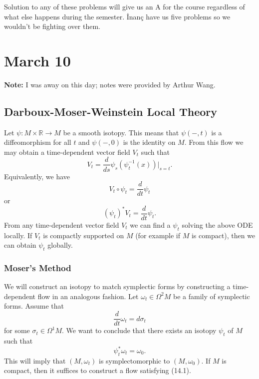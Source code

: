 \documentclass[leqno, openany]{memoir}
\theoremstyle{definition}
\theoremstyle{remark}
\theoremstyle{plain}
\theoremstyle{definition}
\theoremstyle{remark}
\newcommand{\R}{\mathbb{R}}
\begin{document}
Solution to any of these problems will give us an A for the course regardless of what else happens during the semester. \.Inan\c{c} have us five problems so we wouldn't be fighting over them.

\chapter{March 10}%
\label{cha:march_10}

\textbf{Note:} I was away on this day; notes were provided by Arthur Wang.

\section{Darboux-Moser-Weinstein Local Theory}%
\label{sec:darboux_moser_weinstein_local_theory}

Let $\psi: M \times \R \to M$ be a smooth isotopy. This means that $\psi(-,t)$ is a diffeomorphism for all $t$ and $\psi(-,0)$ is the identity on $M$. From this flow we may obtain a time-dependent vector field $V_t$ such that
\[ V_t = \frac{d}{ds} \psi_s(\psi_t^{-1}(x)) \bigg\vert_{s = t}. \]
Equivalently, we have
\[ V_t \circ \psi_t = \frac{d}{dt} \psi_t \]
or
\[ (\psi_t)^* V_t = \frac{d}{dt} \psi_t.\]
From any time-dependent vector field $V_t$ we can find a $\psi_t$ solving the above ODE locally. If $V_t$ is compactly supported on $M$ (for example if $M$ is compact), then we can obtain $\psi_t$ globally.

\subsection{Moser's Method}%
\label{sub:moser_s_method}

We will construct an isotopy to match symplectic forms by constructing a time-dependent flow in an analogous fashion. Let $\omega_t \in \Omega^2M$ be a family of symplectic forms. Assume that 
\[ \frac{d}{dt} \omega_t = d \sigma_t \]
for some $\sigma_t \in \Omega^1 M$. We want to conclude that there exists an isotopy $\psi_t$ of $M$ such that 
\begin{equation}
    \psi_t^* \omega_t = \omega_0.
\end{equation}
This will imply that $(M, \omega_t)$ is symplectomorphic to $(M, \omega_0)$. If $M$ is compact, then it suffices to construct a flow satisfying (14.1).
\end{document}
